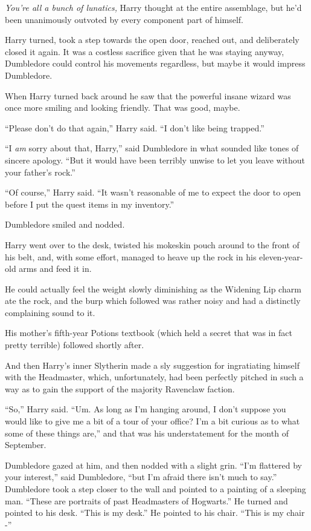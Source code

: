 \emph{You're all a bunch of lunatics,} Harry thought at the entire
assemblage, but he'd been unanimously outvoted by every component part
of himself.

Harry turned, took a step towards the open door, reached out, and
deliberately closed it again. It was a costless sacrifice given that he
was staying anyway, Dumbledore could control his movements regardless,
but maybe it would impress Dumbledore.

When Harry turned back around he saw that the powerful insane wizard was
once more smiling and looking friendly. That was good, maybe.

``Please don't do that again,'' Harry said. ``I don't like being
trapped.''

``I \emph{am} sorry about that, Harry,'' said Dumbledore in what sounded
like tones of sincere apology. ``But it would have been terribly unwise
to let you leave without your father's rock.''

``Of course,'' Harry said. ``It wasn't reasonable of me to expect the
door to open before I put the quest items in my inventory.''

Dumbledore smiled and nodded.

Harry went over to the desk, twisted his mokeskin pouch around to the
front of his belt, and, with some effort, managed to heave up the rock
in his eleven-year-old arms and feed it in.

He could actually feel the weight slowly diminishing as the Widening Lip
charm ate the rock, and the burp which followed was rather noisy and had
a distinctly complaining sound to it.

His mother's fifth-year Potions textbook (which held a secret that was
in fact pretty terrible) followed shortly after.

And then Harry's inner Slytherin made a sly suggestion for ingratiating
himself with the Headmaster, which, unfortunately, had been perfectly
pitched in such a way as to gain the support of the majority Ravenclaw
faction.

``So,'' Harry said. ``Um. As long as I'm hanging around, I don't suppose
you would like to give me a bit of a tour of your office? I'm a bit
curious as to what some of these things are,'' and that was his
understatement for the month of September.

Dumbledore gazed at him, and then nodded with a slight grin. ``I'm
flattered by your interest,'' said Dumbledore, ``but I'm afraid there
isn't much to say.'' Dumbledore took a step closer to the wall and
pointed to a painting of a sleeping man. ``These are portraits of past
Headmasters of Hogwarts.'' He turned and pointed to his desk. ``This is
my desk.'' He pointed to his chair. ``This is my chair -''

